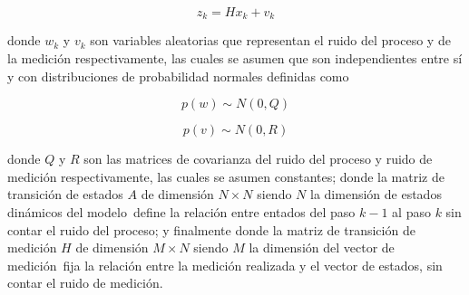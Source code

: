 \begin{equation}
z_k = Hx_k + v_k
\end{equation}

donde $w_k$ y $v_k$ son variables aleatorias que representan el ruido del proceso y de la medición respectivamente, las cuales se asumen que son independientes entre sí y con distribuciones de probabilidad normales definidas como

\begin{equation}
p(w) \sim N(0, Q)
\end{equation}

\begin{equation}
p(v) \sim N(0, R)
\end{equation}

donde $Q$ y $R$ son las matrices de covarianza del ruido del proceso y ruido de medición respectivamente, las cuales se asumen constantes; donde la matriz de transición de estados $A$ de dimensión $N\times N$ \textemdash siendo $N$ la dimensión de estados dinámicos del modelo\textemdash \ define la relación entre entados del paso $k-1$ al paso $k$ sin contar el ruido del proceso; y finalmente donde la matriz de transición de medición $H$ de dimensión $M\times N$ \textemdash siendo $M$ la dimensión del vector de medición\textemdash \  fija la relación entre la medición realizada y el vector de estados, sin contar el ruido de medición.
 




